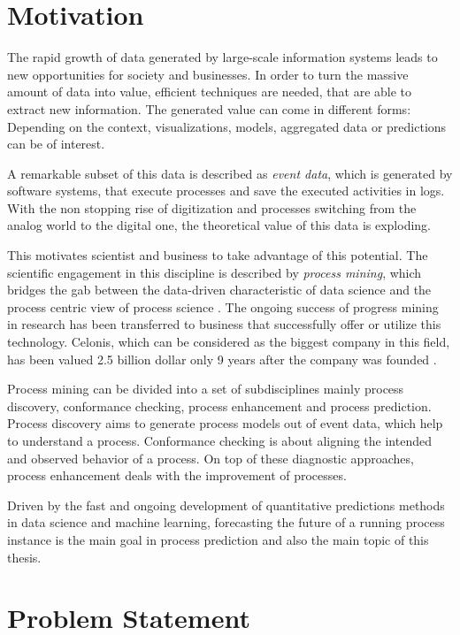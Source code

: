 


\section{Motivation}

The rapid growth of data generated by large-scale information systems leads to new opportunities for  society and businesses.
In order to turn the massive amount of data into value, efficient techniques are needed, that are able to extract new information.
The generated value can come in different forms: Depending on the context, visualizations, models, aggregated data or predictions can be of interest. 

A remarkable subset of this data is described as \textit{event data}, which is generated by software systems, that execute processes and save the executed activities in logs.
With the non stopping rise of digitization and processes switching from the analog world to the digital one, the theoretical value of this data is exploding.

This motivates scientist and business to take advantage of this potential.
The scientific engagement in this discipline is described by \textit{process mining}, which bridges the gab between the data-driven characteristic of data science and the process centric view of process science \cite{DBLP:books/sp/Aalst16}.
The ongoing success of progress mining in research has been transferred to business that successfully offer or utilize this technology.
Celonis, which can be considered as the biggest company in this field, has been valued 2.5 billion dollar only 9 years after the company was founded \cite{celonis}.

Process mining can be divided into a set of subdisciplines mainly process discovery, conformance checking, process enhancement and process prediction.
Process discovery aims to generate process models out of event data, which help to understand a process.
Conformance checking is about aligning the intended and observed behavior of a process. 
On top of these diagnostic approaches, process enhancement deals with the improvement of processes.

Driven by the fast and ongoing development of quantitative predictions methods in data science and machine learning, forecasting the future of a running process instance is the main goal in process prediction and also the main topic of this thesis.

\section{Problem Statement}

